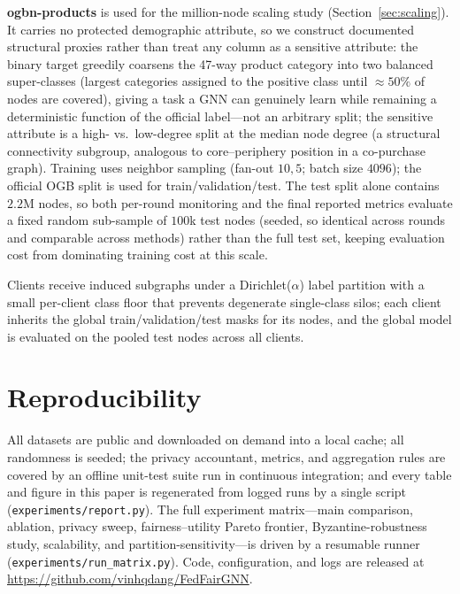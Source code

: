 \documentclass[pdflatex,sn-mathphys-num]{sn-jnl}
\theoremstyle{thmstyleone}%
\theoremstyle{thmstyletwo}%
\theoremstyle{thmstylethree}%
\begin{document}
\begin{appendices}
\textbf{ogbn-products} is used for the million-node scaling study
(Section~\ref{sec:scaling}). It carries no protected demographic attribute, so
we construct documented structural proxies rather than treat any column as a
sensitive attribute: the binary target greedily coarsens the 47-way product
category into two balanced super-classes (largest categories assigned to the
positive class until $\approx\!50\%$ of nodes are covered), giving a task a
GNN can genuinely learn while remaining a deterministic function of the
official label---not an arbitrary split; the sensitive attribute is a
high- vs.\ low-degree split at the median node degree (a structural
connectivity subgroup, analogous to core–periphery position in a co-purchase
graph). Training uses neighbor sampling (fan-out $10,5$; batch size $4096$);
the official OGB split is used for train/validation/test. The test split
alone contains $2.2$M nodes, so both per-round monitoring and the final
reported metrics evaluate a fixed random sub-sample of $100$k test nodes
(seeded, so identical across rounds and comparable across methods) rather
than the full test set, keeping evaluation cost from dominating training
cost at this scale.

Clients receive induced subgraphs under a Dirichlet($\alpha$) label partition
with a small per-client class floor that prevents degenerate single-class silos;
each client inherits the global train/validation/test masks for its nodes, and
the global model is evaluated on the pooled test nodes across all clients.

\section{Reproducibility}
\label{app:repro}
All datasets are public and downloaded on demand into a local cache; all
randomness is seeded; the privacy accountant, metrics, and aggregation rules are
covered by an offline unit-test suite run in continuous integration; and every
table and figure in this paper is regenerated from logged runs by a single
script (\texttt{experiments/report.py}). The full experiment matrix---main
comparison, ablation, privacy sweep, fairness--utility Pareto frontier,
Byzantine-robustness study, scalability, and partition-sensitivity---is driven
by a resumable runner (\texttt{experiments/run\_matrix.py}). Code, configuration,
and logs are released at \url{https://github.com/vinhqdang/FedFairGNN}.

\end{appendices}


\end{document}
